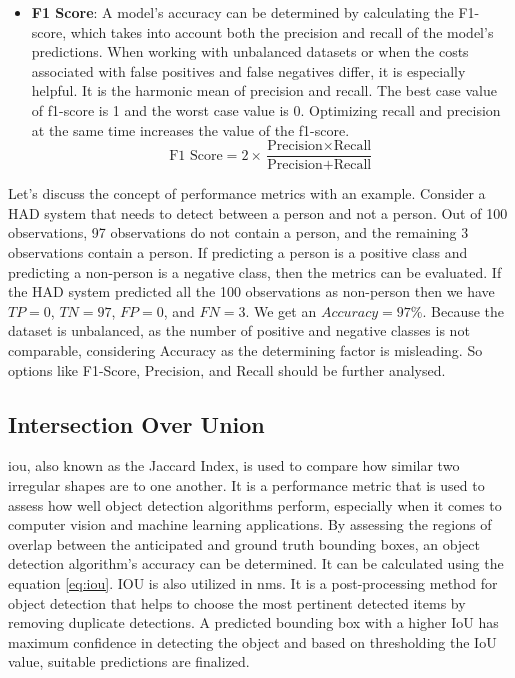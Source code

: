 \begin{itemize}
    \item \textbf{F1 Score}: A model's accuracy can be determined by calculating the F1-score, which takes into account both the precision and recall of the model's predictions. When working with unbalanced datasets or when the costs associated with false positives and false negatives differ, it is especially helpful. It is the harmonic mean of precision and recall. The best case value of f1-score is 1 and the worst case value is 0. Optimizing recall and precision at the same time increases the value of the f1-score.
    \begin{equation}
        \text{F1 Score} = 2 \times \frac{\text{Precision} \times \text{Recall}}{\text{Precision} + \text{Recall}}
    \end{equation}
\end{itemize}


Let's discuss the concept of performance metrics with an example. Consider a HAD system that needs to detect between a person and not a person. Out of 100 observations, 97 observations do not contain a person, and the remaining 3 observations contain a person. If predicting a person is a positive class and predicting a non-person is a negative class, then the metrics can be evaluated. If the HAD system predicted all the 100 observations as non-person then we have \(TP = 0\), \(TN = 97\), \(FP = 0\), and \(FN = 3\). We get an \(Accuracy = 97\%\). Because the dataset is unbalanced, as the number of positive and negative classes is not comparable, considering Accuracy as the determining factor is misleading. So options like F1-Score, Precision, and Recall should be further analysed.

\subsection{Intersection Over Union}
\acrfull{iou}, also known as the Jaccard Index, is used to compare how similar two irregular shapes are to one another. It is a performance metric that is used to assess how well object detection algorithms perform, especially when it comes to computer vision and machine learning applications. By assessing the regions of overlap between the anticipated and ground truth bounding boxes, an object detection algorithm's accuracy can be determined. It can be calculated using the equation \ref{eq:iou}. IOU is also utilized in \acrfull{nms}. It is a post-processing method for object detection that helps to choose the most pertinent detected items by removing duplicate detections. A predicted bounding box with a higher IoU has maximum confidence in detecting the object and based on thresholding the IoU value, suitable predictions are finalized.

